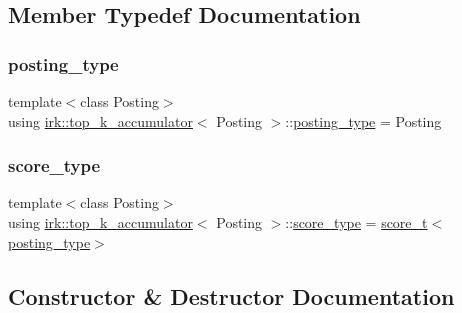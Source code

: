 \subsection{Member Typedef Documentation}
\mbox{\label{classirk_1_1top__k__accumulator_a0ffb312a1991ec1d640d436caa657ee5}} 
\subsubsection{\texorpdfstring{posting\+\_\+type}{posting\_type}}
{\footnotesize\ttfamily template$<$class Posting$>$ \\
using \mbox{\hyperlink{classirk_1_1top__k__accumulator}{irk\+::top\+\_\+k\+\_\+accumulator}}$<$ Posting $>$\+::\mbox{\hyperlink{classirk_1_1top__k__accumulator_a0ffb312a1991ec1d640d436caa657ee5}{posting\+\_\+type}} =  Posting}

\mbox{\label{classirk_1_1top__k__accumulator_a0f5b0bb5549996794b2a06fe17c694d9}} 
\subsubsection{\texorpdfstring{score\+\_\+type}{score\_type}}
{\footnotesize\ttfamily template$<$class Posting$>$ \\
using \mbox{\hyperlink{classirk_1_1top__k__accumulator}{irk\+::top\+\_\+k\+\_\+accumulator}}$<$ Posting $>$\+::\mbox{\hyperlink{classirk_1_1top__k__accumulator_a0f5b0bb5549996794b2a06fe17c694d9}{score\+\_\+type}} =  \mbox{\hyperlink{namespaceirk_a87bce44d1e3fdff0b1b3bb78f2a5f924}{score\+\_\+t}}$<$\mbox{\hyperlink{classirk_1_1top__k__accumulator_a0ffb312a1991ec1d640d436caa657ee5}{posting\+\_\+type}}$>$}



\subsection{Constructor \& Destructor Documentation}
\mbox{\label{classirk_1_1top__k__accumulator_a7baec3d81c3e2e2d33cd4eb1212f951c}} 
